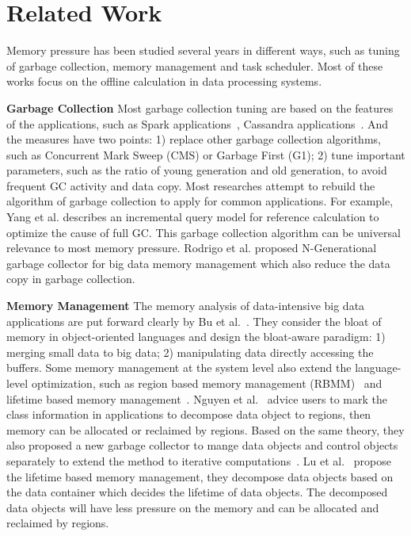 \section{Related Work}

Memory pressure has been studied several years in different ways, such as tuning of garbage collection, memory management and task scheduler. Most of these works focus on the offline calculation in data processing systems. 

\textbf{Garbage Collection} Most garbage collection tuning are based on the features of the applications, such as Spark applications~\cite{www:spark-tuning}, Cassandra applications~\cite{www:cassandra}. And the measures have two points: 1) replace other garbage collection algorithms, such as Concurrent Mark Sweep (CMS) or Garbage First (G1); 2) tune important parameters, such as the ratio of young generation and old generation, to avoid frequent GC activity and data copy. Most researches attempt to rebuild the algorithm of garbage collection to apply for common applications. For example, Yang et al.\cite{yang:fullgc} describes an incremental query model for reference calculation to optimize the cause of full GC. This garbage collection algorithm can be universal relevance to most memory pressure. Rodrigo et al.\cite{rodigo:NGeneration} proposed N-Generational garbage collector for big data memory management which also reduce the data copy in garbage collection.

\textbf{Memory Management} The memory analysis of data-intensive big data applications are put forward clearly by Bu et al.~\cite{bu:bloat}. They consider the bloat of memory in object-oriented languages and design the bloat-aware paradigm: 1) merging small data to big data; 2) manipulating data directly accessing the buffers. Some memory management at the system level also extend the language-level optimization, such as region based memory management (RBMM)~\cite{gog2015broom} and lifetime based memory management~\cite{lulu:deca}. Nguyen et al.~\cite{nguyen2015facade} advice users to mark the class information in applications to decompose data object to regions, then memory can be allocated or reclaimed by regions. Based on the same theory, they also proposed a new garbage collector to mange data objects and control objects separately to extend the method to iterative computations~\cite{nguyen:yak}. Lu et al.~\cite{lulu:deca} propose the lifetime based memory management, they decompose data objects based on the data container which decides the lifetime of data objects. The decomposed data objects will have less pressure on the memory and can be allocated and reclaimed by regions.

